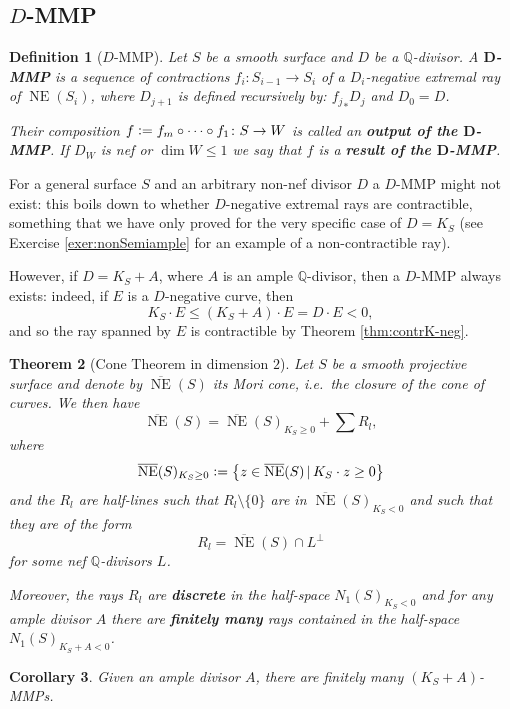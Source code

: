\documentclass[a4paper,11pt]{amsart}
\newtheorem{theorem}{Theorem}[section]
\newtheorem{corollary}[theorem]{Corollary}
\newtheorem{definition}[theorem]{Definition}
\def\dim{\operatorname{dim}}
\def\NE{\operatorname{NE}}
\def\NEb{\overline{\operatorname{NE}}}
\newcommand{\QQ}{\mathbb{Q}}
\newcommand{\defeq}{\vcentcolon=}
\begin{document}
\subsection{$D$-MMP}


\begin{definition}[{$D$-MMP}]
	Let $S$ be a smooth surface and $D$ be a $\QQ$-divisor.
	A \textbf{$\boldsymbol{D}$-MMP} is a sequence of contractions $f_i\colon S_{i-1} \to S_i$ of a $D_i$-negative extremal ray of $\NE(S_i)$, where $D_{j+1}$ is defined recursively by: ${f_j}_*D_{j}$ and $D_0 = D$.	
	
	Their composition $f\defeq f_m\circ \dots \circ f_1 \colon S \to W$ is called an \textbf{output of the $\boldsymbol{D}$-MMP}.	
	If $D_W$ is nef or $\dim W \leq 1$ we say that $f$ is a \textbf{result of the $\boldsymbol{D}$-MMP}.
\end{definition}


For a general surface $S$ and an arbitrary non-nef divisor $D$ a $D$-MMP might not exist:
this boils down to whether $D$-negative extremal rays are contractible, something that we have only proved for the very specific case of $D = K_S$ (see Exercise \ref{exer:nonSemiample} for an example of a non-contractible ray).

However, if $D = K_S + A$, where $A$ is an ample $\QQ$-divisor, then a $D$-MMP always exists:
indeed, if $E$ is a $D$-negative curve, then 
\[
	K_S\cdot E \leq (K_S + A) \cdot E = D\cdot E <0,
\]
and so the ray spanned by $E$ is contractible by Theorem \ref{thm:contrK-neg}.



\begin{theorem}[{Cone Theorem in dimension $2$}]\label{thm:coneThm}
	Let $S$ be a smooth projective surface and denote by $\NEb(S)$ its \emph{Mori cone}, i.e.\ the closure of the cone of curves.
	We then have
	\[
	\NEb(S) = \NEb(S)_{K_S\geq 0} + \sum R_l,
	\]
	where
	\[
	\NEb(S)_{K_S\geq 0} \defeq \left\{z \in \NEb(S) \,|\, K_S\cdot z \geq 0 \right\}
	\]
	and the $R_l$ are half-lines such that $R_l \setminus \{0\}$ are in $\NEb(S)_{K_S<0}$ and such that they are of the form
	\[
	R_l = \NEb(S) \cap L^{\perp}
	\]
	for some nef $\QQ$-divisors $L$.
	
	Moreover, the rays $R_l$ are \textbf{discrete} in the half-space $N_1(S)_{K_S<0}$ and for \emph{any} ample divisor $A$ there are \textbf{finitely many} rays contained in the half-space $N_1(S)_{K_S + A < 0}$.
\end{theorem}

\begin{corollary}\label{cor:finitenessOfMMPs}
	Given an ample divisor $A$, there are finitely many $(K_S + A)$-MMPs.
\end{corollary}
\end{document}
